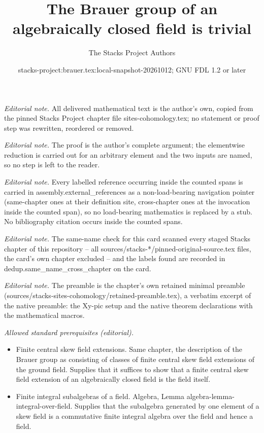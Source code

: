 \documentclass[10pt,a4paper]{amsart}
\title{The Brauer group of an algebraically closed field is trivial}
\author{The Stacks Project Authors}
\date{stacks-project:brauer.tex:local-snapshot-20261012; GNU FDL 1.2 or later}
\theoremstyle{plain}
\theoremstyle{definition}
\theoremstyle{remark}
\numberwithin{equation}{subsection}
\begin{document}
\maketitle
\noindent\textit{Editorial note.} All delivered mathematical text is the author's own, copied from the pinned Stacks Project chapter file sites-cohomology.tex; no statement or proof step was rewritten, reordered or removed.\par\medskip
\noindent\textit{Editorial note.} The proof is the author's complete argument; the elementwise reduction is carried out for an arbitrary element and the two inputs are named, so no step is left to the reader.\par\medskip
\noindent\textit{Editorial note.} Every labelled reference occurring inside the counted spans is carried in assembly.external\_references as a non-load-bearing navigation pointer (same-chapter ones at their definition site, cross-chapter ones at the invocation inside the counted span), so no load-bearing mathematics is replaced by a stub. No bibliography citation occurs inside the counted spans.\par\medskip
\noindent\textit{Editorial note.} The same-name check for this card scanned every staged Stacks chapter of this repository -- all sources/stacks-*/pinned-original-source.tex files, the card's own chapter excluded -- and the labels found are recorded in dedup.same\_name\_cross\_chapter on the card.\par\medskip
\noindent\textit{Editorial note.} The preamble is the chapter's own retained minimal preamble (sources/stacks-sites-cohomology/retained-preamble.tex), a verbatim excerpt of the native preamble: the Xy-pic setup and the native theorem declarations with the mathematical macros.\par\medskip
\noindent\textit{Allowed standard prerequisites (editorial).}\begin{itemize}
\item Finite central skew field extensions. Same chapter, the description of the Brauer group as consisting of classes of finite central skew field extensions of the ground field. Supplies that it suffices to show that a finite central skew field extension of an algebraically closed field is the field itself.
\item Finite integral subalgebras of a field. Algebra, Lemma algebra-lemma-integral-over-field. Supplies that the subalgebra generated by one element of a skew field is a commutative finite integral algebra over the field and hence a field.
\end{itemize}\medskip
\end{document}
